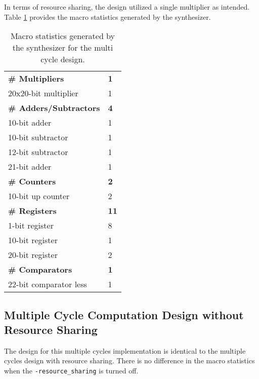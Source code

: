 \documentclass[paper=usletter, fontsize=12pt]{article}
\begin{document}
        In terms of resource sharing, the design utilized a single multiplier
        as intended. Table \ref{table:multimacro} provides the macro statistics
        generated by the synthesizer.

        \begin{table}[h]
            \caption{Macro statistics generated by the synthesizer for the
            multi cycle design.}
            \label{table:multimacro}
            \centering
            \begin{tabular*}{250pt}{ m{20em}m{1cm} }
            \textbf{\# Multipliers}         & \textbf{1} \\
             20x20-bit multiplier           & 1 \\
            \textbf{\# Adders/Subtractors}  & \textbf{4} \\
             10-bit adder                   & 1 \\
             10-bit subtractor              & 1 \\
             12-bit subtractor              & 1 \\
             21-bit adder                   & 1 \\
            \textbf{\# Counters}            & \textbf{2} \\
             10-bit up counter              & 2 \\
            \textbf{\# Registers}           & \textbf{11} \\
             1-bit register                 & 8 \\
             10-bit register                & 1 \\
             20-bit register                & 2 \\
            \textbf{\# Comparators}         & \textbf{1} \\
             22-bit comparator less         & 1 \\
            \end{tabular*}

        \end{table}
        \newpage

        \subsection{Multiple Cycle Computation Design without Resource Sharing}
        The design for this multiple cycles implementation is identical to the
        multiple cycles design with resource sharing. There is no difference in
        the macro statistics when the \texttt{-resource\_sharing} is turned
        off.
\end{document}
